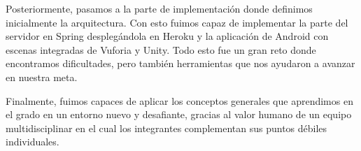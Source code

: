 Posteriormente, pasamos a la parte de implementación donde definimos
 inicialmente la arquitectura. Con esto fuimos capaz de implementar
 la parte del servidor en Spring desplegándola en Heroku
 y la aplicación de Android con escenas integradas de Vuforia y
 Unity. Todo esto fue un gran reto donde encontramos dificultades,
 pero también herramientas que nos ayudaron a avanzar en nuestra meta. 

Finalmente, fuimos capaces de aplicar los conceptos generales que aprendimos
 en el grado en un entorno nuevo y desafiante, gracias al valor humano de
 un equipo multidisciplinar en el cual los integrantes complementan sus
 puntos débiles individuales. 
